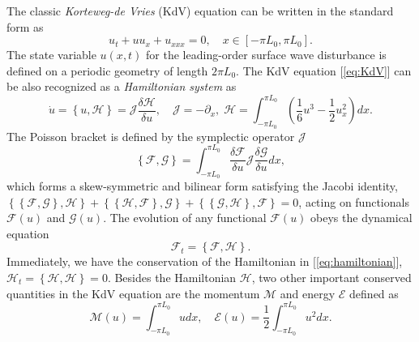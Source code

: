 \documentclass[9pt,twoside,lineno]{pnas-new}
\theoremstyle{plain}
\theoremstyle{plain}
\begin{document}
The classic \emph{Korteweg-de Vries} (KdV) equation \cite{johnson1997modern}
can be written in the standard form as
\begin{equation}
u_{t}+uu_{x}+u_{xxx}=0,\quad x\in\left[-\pi L_{0},\pi L_{0}\right].\label{eq:KdV}
\end{equation}
The state variable $u\left(x,t\right)$ for the leading-order surface
wave disturbance is defined on a periodic geometry of length $2\pi L_{0}$.
The KdV equation [\ref{eq:KdV}] can be also recognized as a \emph{Hamiltonian
system} as
\begin{equation}
\dot{u}=\left\{ u,\mathcal{H}\right\} =\mathcal{J}\frac{\delta\mathcal{H}}{\delta u},\quad\mathcal{J}=-\partial_{x},\;\mathcal{H}=\int_{-\pi L_{0}}^{\pi L_{0}}\left(\frac{1}{6}u^{3}-\frac{1}{2}u_{x}^{2}\right)dx.\label{eq:hamiltonian}
\end{equation}
The Poisson bracket is defined by the symplectic operator $\mathcal{J}$
\[
\left\{ \mathcal{F},\mathcal{G}\right\} =\int_{-\pi L_{0}}^{\pi L_{0}}\frac{\delta\mathcal{F}}{\delta u}\mathcal{J}\frac{\delta\mathcal{G}}{\delta u}dx,
\]
which forms a skew-symmetric and bilinear form satisfying the Jacobi
identity, $\left\{ \left\{ \mathcal{F},\mathcal{G}\right\} ,\mathcal{H}\right\} +\left\{ \left\{ \mathcal{H},\mathcal{F}\right\} ,\mathcal{G}\right\} +\left\{ \left\{ \mathcal{G},\mathcal{H}\right\} ,\mathcal{F}\right\} =0$,
acting on functionals $\mathcal{F}\left(u\right)$ and $\mathcal{G}\left(u\right)$.
The evolution of any functional $\mathcal{F}\left(u\right)$ obeys
the dynamical equation
\[
\mathcal{F}_{t}=\left\{ \mathcal{F},\mathcal{H}\right\} .
\]
Immediately, we have the conservation of the Hamiltonian in [\ref{eq:hamiltonian}],
$\mathcal{H}_{t}=\left\{ \mathcal{H},\mathcal{H}\right\} =0$. Besides
the Hamiltonian $\mathcal{H}$, two other important conserved quantities
in the KdV equation are the momentum $\mathcal{M}$ and energy $\mathcal{E}$
defined as 
\[
\mathcal{M}\left(u\right)=\int_{-\pi L_{0}}^{\pi L_{0}}udx,\quad\mathcal{E}\left(u\right)=\frac{1}{2}\int_{-\pi L_{0}}^{\pi L_{0}}u^{2}dx.
\]
\end{document}

